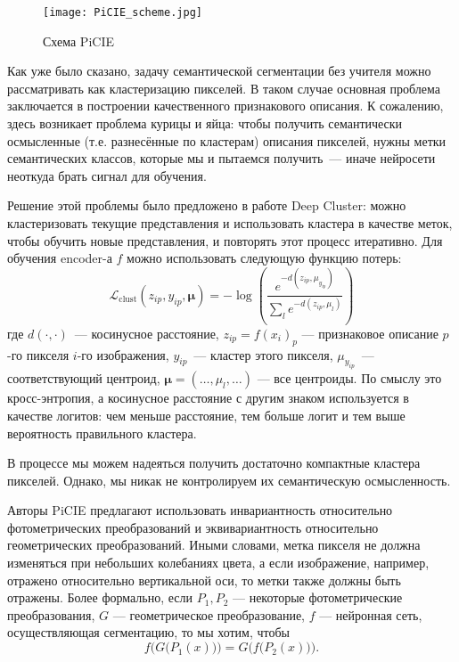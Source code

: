    \begin{figure}
        \centering
        \texttt{[image: PiCIE\_scheme.jpg]}
        \caption{Схема PiCIE}
    \end{figure}

    Как уже было сказано, задачу семантической сегментации без учителя можно рассматривать как кластеризацию пикселей.
    В таком случае основная проблема заключается в построении качественного признакового описания.
    К сожалению, здесь возникает проблема курицы и яйца: чтобы получить семантически осмысленные (т.е. разнесённые по кластерам)
    описания пикселей, нужны метки семантических классов, которые мы и пытаемся получить~--- иначе нейросети неоткуда брать сигнал для обучения.

    Решение этой проблемы было предложено в работе Deep Cluster: можно кластеризовать текущие представления 
    и использовать кластера в качестве меток, чтобы обучить новые представления, и повторять этот процесс итеративно.
    Для обучения encoder-а $f$ можно использовать следующую функцию потерь:
    \begin{equation}
        \mathcal{L}_\text{clust} (z_{ip}, y_{ip}, \bm{\mu}) = 
        -\log \left( \frac{e^{-d(z_{ip}, \mu_{y_{ip}})}}{\sum_{l} e^{-d(z_{ip}, \mu_{l})}} \right)
    \end{equation}
    где $d(\cdot, \cdot)$~--- косинусное расстояние, $z_{ip} = f(x_i)_p$ --- признаковое описание $p$-го пикселя $i$-го изображения,
    $y_{ip}$~--- кластер этого пикселя, $\mu_{y_{ip}}$~--- соответствующий центроид, $\bm{\mu} = (\ldots, \mu_l, \ldots)$ --- все центроиды.
    По смыслу это кросс-энтропия, а косинусное расстояние с другим знаком используется в качестве логитов: чем меньше расстояние, тем больше логит и тем выше вероятность правильного кластера.

    В процессе мы можем надеяться получить достаточно компактные кластера пикселей.
    Однако, мы никак не контролируем их семантическую осмысленность.

    Авторы PiCIE предлагают использовать инвариантность относительно фотометрических преобразований 
    и эквивариантность относительно геометрических преобразований. 
    Иными словами, метка пикселя не должна изменяться при небольших колебаниях цвета,
    а если изображение, например, отражено относительно вертикальной оси, то метки также должны быть отражены.
    Более формально, если $P_1, P_2$ --- некоторые фотометрические преобразования, $G$ --- геометрическое преобразование, 
    $f$ --- нейронная сеть, осуществляющая сегментацию, то мы хотим, чтобы
    \begin{equation}    
        f\bigl(G\bigl(P_1(x)\bigr)\bigr) = G\bigl(f\bigl(P_2(x)\bigr)\bigr).
    \end{equation}

